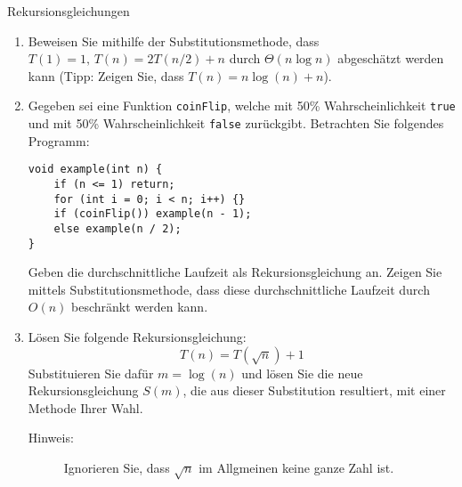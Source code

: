 \documentclass[11pt,a4paper]{article}
\begin{document}
\begin{aufgabe}{1}{Rekursionsgleichungen}
\begin{enumerate}
    \item Beweisen Sie mithilfe der Substitutionsmethode, dass $T(1) = 1, \, T(n) = 2T(n / 2) + n$ durch $\Theta(n \log n)$ abgeschätzt werden kann (Tipp: Zeigen Sie, dass $T(n) = n \log(n) + n$).

    \item \hard Gegeben sei eine Funktion \texttt{coinFlip}, welche mit 50\% Wahrscheinlichkeit \texttt{true} und mit 50\% Wahrscheinlichkeit \texttt{false} zurückgibt. Betrachten Sie folgendes Programm:
    \begin{lstlisting}
void example(int n) {
    if (n <= 1) return;
    for (int i = 0; i < n; i++) {}
    if (coinFlip()) example(n - 1);
    else example(n / 2);
}
    \end{lstlisting}
    Geben die durchschnittliche Laufzeit als Rekursionsgleichung an.
    Zeigen Sie mittels Substitutionsmethode, dass diese durchschnittliche Laufzeit durch $O(n)$ beschränkt werden kann.

    \item
    \hard Lösen Sie folgende Rekursionsgleichung:
    \begin{equation*}
        T(n) = T\left(\sqrt{n}\right) + 1
    \end{equation*}
    Substituieren Sie dafür $m = \log(n)$ und lösen Sie die neue Rekursionsgleichung $S(m)$, die aus dieser Substitution resultiert, mit einer Methode Ihrer Wahl.
    \begin{description}
        \item[Hinweis:] Ignorieren Sie, dass $\sqrt{n}$ im Allgmeinen keine ganze Zahl ist.
    \end{description}
\end{enumerate}
\end{aufgabe}
\end{document}
